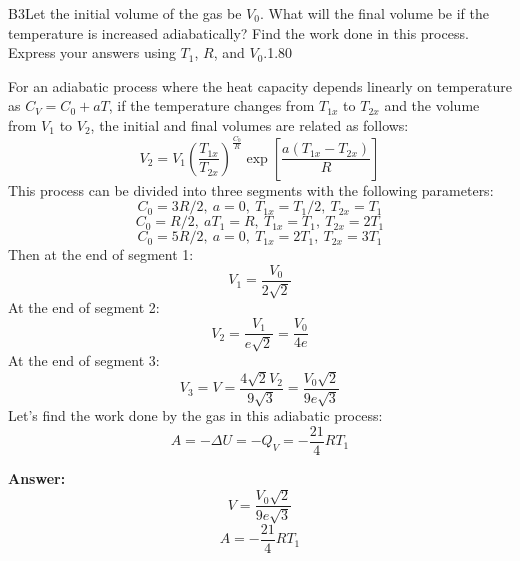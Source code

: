 \documentclass[11pt,a4paper]{article}
\begin{document}
\begin{solcard}{B3}{Let the initial volume of the gas be $V_0$. What will the final volume be if the temperature is increased adiabatically? Find the work done in this process. Express your answers using $T_1$, $R$, and $V_0$.}{1.80}

For an adiabatic process where the heat capacity depends linearly on temperature as $C_V=C_0+aT$, if the temperature changes from $T_{1x}$ to $T_{2x}$ and the volume from $V_1$ to $V_2$, the initial and final volumes are related as follows: \[V_2=V_1\left(\dfrac{T_{1x}}{T_{2x}}\right)^\frac{C_0}{R}\exp\left[\dfrac{a(T_{1x}-T_{2x})}{R}\right]\]This process can be divided into three segments with the following parameters: \[C_0=3R/2, ~a=0, ~T_{1x}=T_1/2, ~T_{2x}=T_1\]\[C_0=R/2, ~aT_1=R, ~T_{1x}=T_1, ~T_{2x}=2T_1\]\[C_0=5R/2, ~a=0, ~T_{1x}=2T_1, ~T_{2x}=3T_1\]Then at the end of segment 1: \[V_1=\dfrac{V_0}{2\sqrt{2}}\]At the end of segment 2: \[V_2=\dfrac{V_1}{e\sqrt{2}}=\dfrac{V_0}{4e}\]At the end of segment 3: \[V_3=V=\dfrac{4\sqrt{2}V_2}{9\sqrt{3}}=\dfrac{V_0\sqrt{2}}{9e\sqrt{3}}\]Let's find the work done by the gas in this adiabatic process: \[A=-\Delta U=-Q_V=-\frac{21}{4}RT_1\]

\par\smallskip\noindent\textbf{Answer:} \[V=\dfrac{V_0\sqrt{2}}{9e\sqrt{3}}\]\[A=-\frac{21}{4}RT_1\]
\end{solcard}
\end{document}
